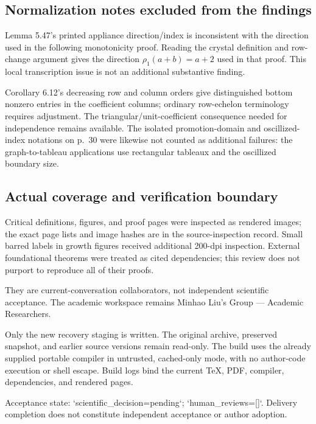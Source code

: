 \documentclass[10pt]{article}
\begin{document}
\subsection*{Normalization notes excluded from the findings}
Lemma 5.47’s printed appliance direction/index is inconsistent with the direction used in the following monotonicity proof. Reading the crystal definition and row-change argument gives the direction \(\rho_1(a+b)=a+2\) used in that proof. This local transcription issue is not an additional substantive finding.\par
Corollary 6.12’s decreasing row and column orders give distinguished bottom nonzero entries in the coefficient columns; ordinary row-echelon terminology requires adjustment. The triangular/unit-coefficient consequence needed for independence remains available. The isolated promotion-domain and oscillized-index notations on p. 30 were likewise not counted as additional failures: the graph-to-tableau applications use rectangular tableaux and the oscillized boundary size.\par
\subsection*{Actual coverage and verification boundary}
Critical definitions, figures, and proof pages were inspected as rendered images; the exact page lists and image hashes are in the source-inspection record. Small barred labels in growth figures received additional 200-dpi inspection. External foundational theorems were treated as cited dependencies; this review does not purport to reproduce all of their proofs.\par
They are current-conversation collaborators, not independent scientific acceptance. The academic workspace remains Minhao Liu’s Group — Academic Researchers.\par
Only the new recovery staging is written. The original archive, preserved snapshot, and earlier source versions remain read-only. The build uses the already supplied portable compiler in untrusted, cached-only mode, with no author-code execution or shell escape. Build logs bind the current TeX, PDF, compiler, dependencies, and rendered pages.\par
Acceptance state: `scientific\_decision=pending`; `human\_reviews=[]`. Delivery completion does not constitute independent acceptance or author adoption.\par
\end{document}
